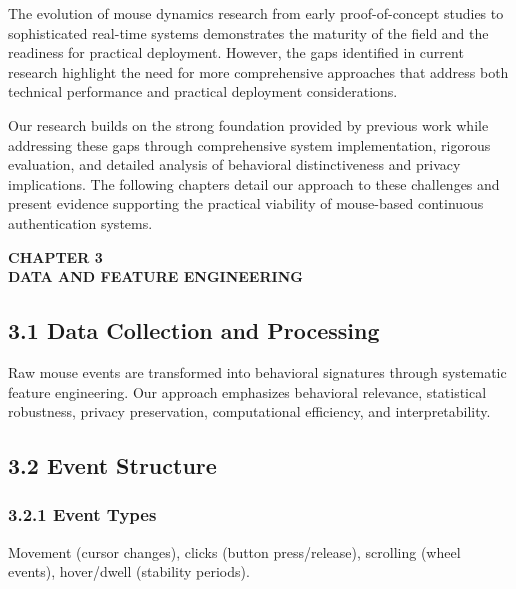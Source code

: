\documentclass[
  11pt,
  a4paper,
]{article}
\begin{document}
The evolution of mouse dynamics research from early proof-of-concept
studies to sophisticated real-time systems demonstrates the maturity of
the field and the readiness for practical deployment. However, the gaps
identified in current research highlight the need for more comprehensive
approaches that address both technical performance and practical
deployment considerations.

Our research builds on the strong foundation provided by previous work
while addressing these gaps through comprehensive system implementation,
rigorous evaluation, and detailed analysis of behavioral distinctiveness
and privacy implications. The following chapters detail our approach to
these challenges and present evidence supporting the practical viability
of mouse-based continuous authentication systems.

\newpage

\newpage
\thispagestyle{plain}

\begin{center}
\vspace*{2cm}
\textbf{\Large CHAPTER 3}\\[0.5cm]
\textbf{\Large DATA AND FEATURE ENGINEERING}
\end{center}

\newpage

\subsection{3.1 Data Collection and
Processing}\label{data-collection-and-processing}

Raw mouse events are transformed into behavioral signatures through
systematic feature engineering. Our approach emphasizes behavioral
relevance, statistical robustness, privacy preservation, computational
efficiency, and interpretability.

\subsection{3.2 Event Structure}\label{event-structure}

\subsubsection{3.2.1 Event Types}\label{event-types}

Movement (cursor changes), clicks (button press/release), scrolling
(wheel events), hover/dwell (stability periods).
\end{document}
